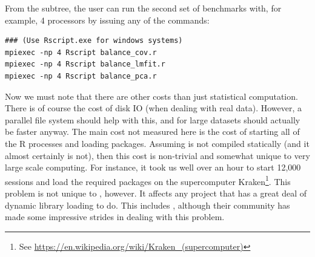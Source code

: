 From the  subtree, the user can run the second set of benchmarks with, for example, 4 processors by issuing any of the commands:
\begin{lstlisting}
### (Use Rscript.exe for windows systems)
mpiexec -np 4 Rscript balance_cov.r
mpiexec -np 4 Rscript balance_lmfit.r
mpiexec -np 4 Rscript balance_pca.r
\end{lstlisting}

Now we must note that there are other costs than just statistical computation.  There is of course the cost of disk IO (when dealing with real data).  However, a parallel file system should help with this, and for large datasets should actually be faster anyway.  The main cost not measured here is the cost of starting all of the R processes and loading packages.  Assuming  is not compiled statically (and it almost certainly is not), then this cost is non-trivial and somewhat unique to very large scale computing.  For instance, it took us well over an hour to start 12,000  sessions and load the required packages on the supercomputer Kraken\footnote{See \url{https://en.wikipedia.org/wiki/Kraken_(supercomputer)}}.  This problem is not unique to , however.  It affects any project that has a great deal of dynamic library loading to do.  This includes , although their community has made some impressive strides in dealing with this problem.
